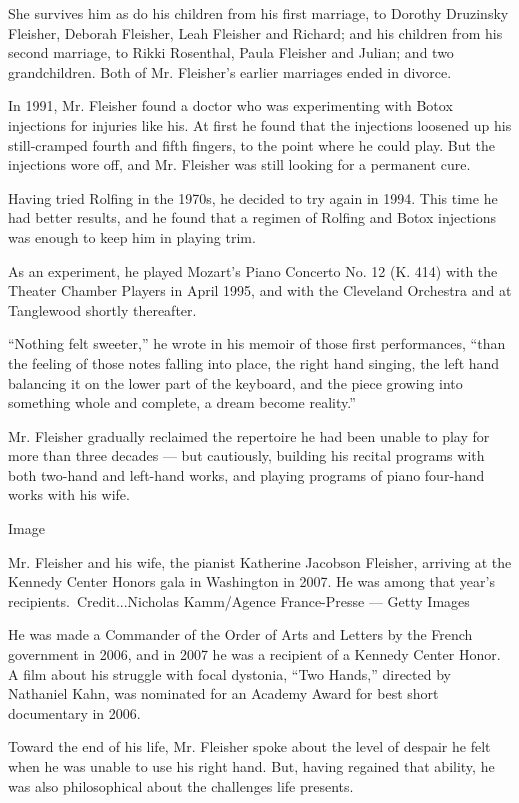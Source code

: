 She survives him as do his children from his first marriage, to Dorothy
Druzinsky Fleisher, Deborah Fleisher, Leah Fleisher and Richard; and his
children from his second marriage, to Rikki Rosenthal, Paula Fleisher
and Julian; and two grandchildren. Both of Mr. Fleisher's earlier
marriages ended in divorce.

In 1991, Mr. Fleisher found a doctor who was experimenting with Botox
injections for injuries like his. At first he found that the injections
loosened up his still-cramped fourth and fifth fingers, to the point
where he could play. But the injections wore off, and Mr. Fleisher was
still looking for a permanent cure.

Having tried Rolfing in the 1970s, he decided to try again in 1994. This
time he had better results, and he found that a regimen of Rolfing and
Botox injections was enough to keep him in playing trim.

As an experiment, he played Mozart's Piano Concerto No. 12 (K. 414) with
the Theater Chamber Players in April 1995, and with the Cleveland
Orchestra and at Tanglewood shortly thereafter.

``Nothing felt sweeter,'' he wrote in his memoir of those first
performances, ``than the feeling of those notes falling into place, the
right hand singing, the left hand balancing it on the lower part of the
keyboard, and the piece growing into something whole and complete, a
dream become reality.''

Mr. Fleisher gradually reclaimed the repertoire he had been unable to
play for more than three decades --- but cautiously, building his
recital programs with both two-hand and left-hand works, and playing
programs of piano four-hand works with his wife.

Image

Mr. Fleisher and his wife, the pianist Katherine Jacobson Fleisher,
arriving at the Kennedy Center Honors gala in Washington in 2007. He was
among that year's recipients.~Credit...Nicholas Kamm/Agence
France-Presse --- Getty Images

He was made a Commander of the Order of Arts and Letters by the French
government in 2006, and in 2007 he was a recipient of a Kennedy Center
Honor. A film about his struggle with focal dystonia, ``Two Hands,''
directed by Nathaniel Kahn, was nominated for an Academy Award for best
short documentary in 2006.

Toward the end of his life, Mr. Fleisher spoke about the level of
despair he felt when he was unable to use his right hand. But, having
regained that ability, he was also philosophical about the challenges
life presents.

